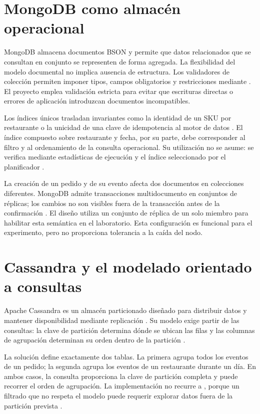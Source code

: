 \section{MongoDB como almacén operacional}

MongoDB almacena documentos BSON y permite que datos relacionados que se consultan en conjunto se representen de forma agregada. La flexibilidad del modelo documental no implica ausencia de estructura. Los validadores de colección permiten imponer tipos, campos obligatorios y restricciones mediante  \parencite{mongodbValidation}. El proyecto emplea validación estricta para evitar que escrituras directas o errores de aplicación introduzcan documentos incompatibles.

Los índices únicos trasladan invariantes como la identidad de un SKU por restaurante o la unicidad de una clave de idempotencia al motor de datos \parencite{mongodbUniqueIndexes}. El índice compuesto sobre restaurante y fecha, por su parte, debe corresponder al filtro y al ordenamiento de la consulta operacional. Su utilización no se asume: se verifica mediante estadísticas de ejecución y el índice seleccionado por el planificador \parencite{mongodbExplain}.

La creación de un pedido y de su evento afecta dos documentos en colecciones diferentes. MongoDB admite transacciones multidocumento en conjuntos de réplicas; los cambios no son visibles fuera de la transacción antes de la confirmación \parencite{mongodbTransactions}. El diseño utiliza un conjunto de réplica de un solo miembro para habilitar esta semántica en el laboratorio. Esta configuración es funcional para el experimento, pero no proporciona tolerancia a la caída del nodo.

\section{Cassandra y el modelado orientado a consultas}

Apache Cassandra es un almacén particionado diseñado para distribuir datos y mantener disponibilidad mediante replicación \parencite{lakshman2010}. Su modelo exige partir de las consultas: la clave de partición determina dónde se ubican las filas y las columnas de agrupación determinan su orden dentro de la partición \parencite{cassandraDDL}.

La solución define exactamente dos tablas. La primera agrupa todos los eventos de un pedido; la segunda agrupa los eventos de un restaurante durante un día. En ambos casos, la consulta proporciona la clave de partición completa y puede recorrer el orden de agrupación. La implementación no recurre a , porque un filtrado que no respeta el modelo puede requerir explorar datos fuera de la partición prevista \parencite{cassandraDML}.


